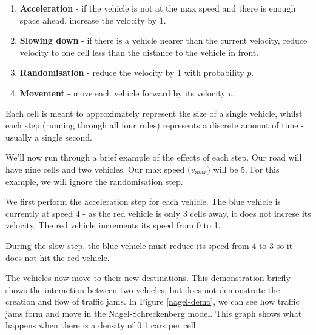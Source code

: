 \documentclass[ %
                    author={Alexander Hill},
                supervisor={Dr. Benjamin Sach},
                    degree={MEng},
                     title={MARMOSET},
                  subtitle={Multi-Agent Route Management using Online Simulation for Efficient Transportation},
                      type={research},
                      year={2016} ]{dissertation}
\begin{document}
\begin{enumerate}
    \item \textbf{Acceleration} - if the vehicle is not at the max speed and
        there is enough space ahead, increase the velocity by 1.
    \item \textbf{Slowing down} - if there is a vehicle nearer than the current
        velocity, reduce velocity to one cell less than the distance to the
        vehicle in front.
    \item \textbf{Randomisation} - reduce the velocity by 1 with probability
        $p$.
    \item \textbf{Movement} - move each vehicle forward by its velocity $v$.
\end{enumerate}

Each cell is meant to approximately represent the size of a single vehicle,
whilst each step (running through all four rules) represents a discrete amount
of time - usually a single second.

We'll now run through a brief example of the effects of each step. Our road will
have nine cells and two vehicles. Our max speed ($v_{max}$) will be 5.  For this
example, we will ignore the randomisation step.

\begin{figure}[!h]
\centering
{}
\end{figure}

We first perform the acceleration step for each vehicle. The blue vehicle
is currently at speed 4 - as the red vehicle is only 3 cells away, it does
not increse its velocity. The red vehicle increments its speed from 0 to 1.

During the slow step, the blue vehicle must reduce its speed from 4 to 3
so it does not hit the red vehicle.

\begin{figure}[!h]
\centering
{}
\end{figure}

The vehicles now move to their new destinations. This demonstration briefly
shows the interaction between two vehicles, but does not demonstrate the
creation and flow of traffic jams. In Figure \ref{nagel-demo}, we can see how
traffic jams form and move in the Nagel-Schreckenberg model. This graph shows
what happens when there is a density of 0.1 cars per cell.
\end{document}
